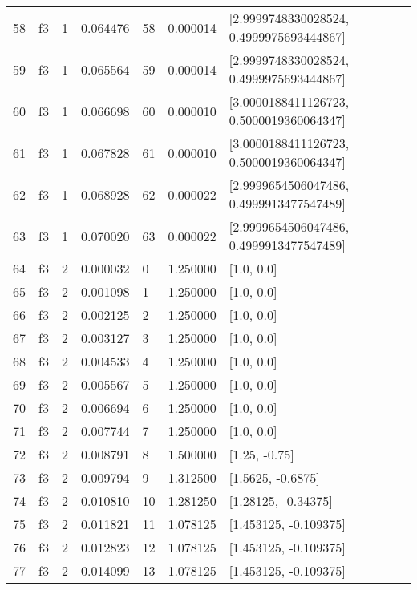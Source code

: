 \begin{tabular}{lllrlrl}
58  &  f3 &   1 &  0.064476 &   58 &  0.000014 &   [2.9999748330028524, 0.4999975693444867] \\
59  &  f3 &   1 &  0.065564 &   59 &  0.000014 &   [2.9999748330028524, 0.4999975693444867] \\
60  &  f3 &   1 &  0.066698 &   60 &  0.000010 &   [3.0000188411126723, 0.5000019360064347] \\
61  &  f3 &   1 &  0.067828 &   61 &  0.000010 &   [3.0000188411126723, 0.5000019360064347] \\
62  &  f3 &   1 &  0.068928 &   62 &  0.000022 &   [2.9999654506047486, 0.4999913477547489] \\
63  &  f3 &   1 &  0.070020 &   63 &  0.000022 &   [2.9999654506047486, 0.4999913477547489] \\
64  &  f3 &   2 &  0.000032 &    0 &  1.250000 &                                 [1.0, 0.0] \\
65  &  f3 &   2 &  0.001098 &    1 &  1.250000 &                                 [1.0, 0.0] \\
66  &  f3 &   2 &  0.002125 &    2 &  1.250000 &                                 [1.0, 0.0] \\
67  &  f3 &   2 &  0.003127 &    3 &  1.250000 &                                 [1.0, 0.0] \\
68  &  f3 &   2 &  0.004533 &    4 &  1.250000 &                                 [1.0, 0.0] \\
69  &  f3 &   2 &  0.005567 &    5 &  1.250000 &                                 [1.0, 0.0] \\
70  &  f3 &   2 &  0.006694 &    6 &  1.250000 &                                 [1.0, 0.0] \\
71  &  f3 &   2 &  0.007744 &    7 &  1.250000 &                                 [1.0, 0.0] \\
72  &  f3 &   2 &  0.008791 &    8 &  1.500000 &                              [1.25, -0.75] \\
73  &  f3 &   2 &  0.009794 &    9 &  1.312500 &                          [1.5625, -0.6875] \\
74  &  f3 &   2 &  0.010810 &   10 &  1.281250 &                        [1.28125, -0.34375] \\
75  &  f3 &   2 &  0.011821 &   11 &  1.078125 &                      [1.453125, -0.109375] \\
76  &  f3 &   2 &  0.012823 &   12 &  1.078125 &                      [1.453125, -0.109375] \\
77  &  f3 &   2 &  0.014099 &   13 &  1.078125 &                      [1.453125, -0.109375] \\

\end{tabular}

